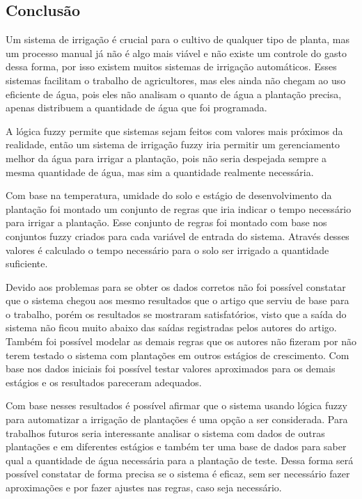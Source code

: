 \documentclass[
	article,			%
	11pt,				%
	oneside,			%
	a4paper,			%
	english,			%
	brazil,				%
	sumario=tradicional
	]{abntex2}
\begin{document}
\begin{multicols}{2}

\section*{Conclusão}
Um sistema de irrigação é crucial para o cultivo de qualquer tipo de planta, mas um processo manual já não é algo mais viável e não existe um controle do gasto dessa forma, por isso existem muitos sistemas de irrigação automáticos. Esses sistemas facilitam o trabalho de agricultores, mas eles ainda não chegam ao uso eficiente de água, pois eles não analisam o quanto de água a plantação precisa, apenas distribuem a quantidade de água que foi programada.

A lógica fuzzy permite que sistemas sejam feitos com valores mais próximos da realidade, então um sistema de irrigação fuzzy iria permitir um gerenciamento melhor da água para irrigar a plantação, pois não seria despejada sempre a mesma quantidade de água, mas sim a quantidade realmente necessária.

Com base na temperatura, umidade do solo e estágio de desenvolvimento da plantação foi montado um conjunto de regras que iria indicar o tempo necessário para irrigar a plantação. Esse conjunto de regras foi montado com base nos conjuntos fuzzy criados para cada variável de entrada do sistema. Através desses valores é calculado o tempo necessário para o solo ser irrigado a quantidade suficiente.

Devido aos problemas para se obter os dados corretos não foi possível constatar que o sistema chegou aos mesmo resultados que o artigo que serviu de base para o trabalho, porém os resultados se mostraram satisfatórios, visto que a saída do sistema não ficou muito abaixo das saídas registradas pelos autores do artigo. Também foi possível modelar as demais regras que os autores não fizeram por não terem testado o sistema com plantações em outros estágios de crescimento. Com base nos dados iniciais foi possível testar valores aproximados para os demais estágios e os resultados pareceram adequados.

Com base nesses resultados é possível afirmar que o sistema usando lógica fuzzy para automatizar a irrigação de plantações é uma opção a ser considerada. Para trabalhos futuros seria interessante analisar o sistema com dados de outras plantações e em diferentes estágios e também ter uma base de dados para saber qual a quantidade de água necessária para a plantação de teste. Dessa forma será possível constatar de forma precisa se o sistema é eficaz, sem ser necessário fazer aproximações e por fazer ajustes nas regras, caso seja necessário.

\end{multicols}
\end{document}
